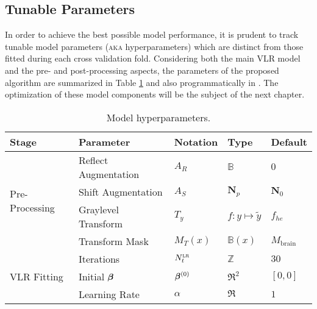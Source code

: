 \subsection{Tunable Parameters}
In order to achieve the best possible model performance, it is prudent to track tunable model parameters (\textsc{aka} hyperparameters) which are distinct from those fitted during each cross validation fold.
Considering both the main VLR model and the pre- and post-processing aspects, the parameters of the proposed algorithm are summarized in Table \ref{tab:hyperparams} and also programmatically in .
The optimization of these model components will be the subject of the next chapter.
\begin{table}
  \centering
  \caption{Model hyperparameters.}
  \label{tab:hyperparams}
  \begin{tabular}{lllll}
  	\hline
  	Stage                            & Parameter            & Notation                    & Type                                              & Default                   \\ \hline
  	\multirow{4}{*}{Pre-Processing}  & Reflect Augmentation & $A_R$                       & $\mathbb{B}$                                      & $0$                       \\
  	                                 & Shift Augmentation   & $A_S$                       & $\mathbf{N}_p$                                    & $\mathbf{N}_0$            \\
  	                                 & Graylevel Transform  & $T_y$                       & $f: y\mapsto \tilde{y}$                           & $f_{he}$                  \\
  	                                 & Transform Mask       & $M_{T}(x)$                  & $\mathbb{B}(x)$                                   & $M_{\text{brain}}$        \\ \hline
  	\multirow{6}{*}{VLR Fitting}     & Iterations           & $N_{t}^{\textsc{lr}}$               & $\mathbb{Z}$                                      & $30$                      \\
  	                                 & Initial $\bm{\beta}$        & $\bm{\beta}^{(0)}$                 & $\Re^2$                                           & $[0,0]$                   \\
  	                                 & Learning Rate        & $\alpha$                    & $\Re$                                             & $1$                       \\

\end{tabular}
\end{table}
